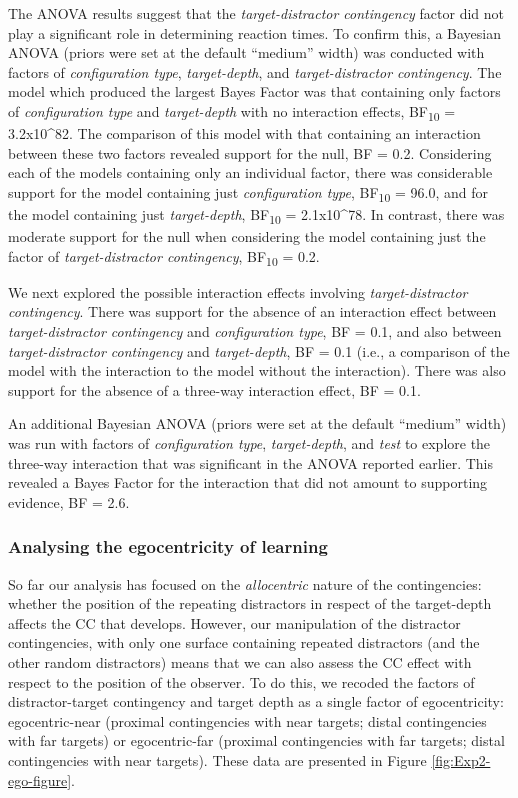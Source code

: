 \documentclass[
  english,
  man,floatsintext]{apa7}
\begin{document}
The ANOVA results suggest that the \emph{target-distractor contingency} factor did not play a significant role in determining reaction times. To confirm this, a Bayesian ANOVA (priors were set at the default ``medium'' width) was conducted with factors of \emph{configuration type}, \emph{target-depth}, and \emph{target-distractor contingency}. The model which produced the largest Bayes Factor was that containing only factors of \emph{configuration type} and \emph{target-depth} with no interaction effects, BF\textsubscript{10} = 3.2x10\^{}82. The comparison of this model with that containing an interaction between these two factors revealed support for the null, BF = 0.2. Considering each of the models containing only an individual factor, there was considerable support for the model containing just \emph{configuration type}, BF\textsubscript{10} = 96.0, and for the model containing just \emph{target-depth}, BF\textsubscript{10} = 2.1x10\^{}78. In contrast, there was moderate support for the null when considering the model containing just the factor of \emph{target-distractor contingency}, BF\textsubscript{10} = 0.2.

We next explored the possible interaction effects involving \emph{target-distractor contingency}. There was support for the absence of an interaction effect between \emph{target-distractor contingency} and \emph{configuration type}, BF = 0.1, and also between \emph{target-distractor contingency} and \emph{target-depth}, BF = 0.1 (i.e., a comparison of the model with the interaction to the model without the interaction). There was also support for the absence of a three-way interaction effect, BF = 0.1.

An additional Bayesian ANOVA (priors were set at the default ``medium'' width) was run with factors of \emph{configuration type}, \emph{target-depth}, and \emph{test} to explore the three-way interaction that was significant in the ANOVA reported earlier. This revealed a Bayes Factor for the interaction that did not amount to supporting evidence, BF = 2.6.

\hypertarget{analysing-the-egocentricity-of-learning}{%
\subsubsection{Analysing the egocentricity of learning}\label{analysing-the-egocentricity-of-learning}}

So far our analysis has focused on the \emph{allocentric} nature of the contingencies: whether the position of the repeating distractors in respect of the target-depth affects the CC that develops. However, our manipulation of the distractor contingencies, with only one surface containing repeated distractors (and the other random distractors) means that we can also assess the CC effect with respect to the position of the observer. To do this, we recoded the factors of distractor-target contingency and target depth as a single factor of egocentricity: egocentric-near (proximal contingencies with near targets; distal contingencies with far targets) or egocentric-far (proximal contingencies with far targets; distal contingencies with near targets). These data are presented in Figure \ref{fig:Exp2-ego-figure}.
\end{document}
